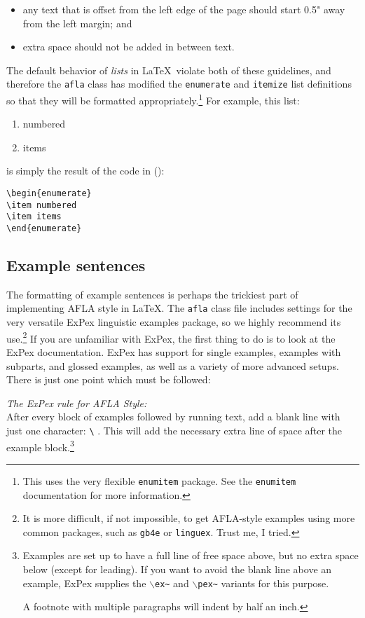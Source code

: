 \documentclass{afla}
\begin{document}
\begin{itemize}
\item any text that is offset from the left edge of the page should start 0.5" away from the left margin; and
\item extra space should not be added in between text.
\end{itemize}

\noindent The default behavior of \textit{lists} in \LaTeX\ violate both of these guidelines, and therefore the \verb`afla` class has modified the \verb`enumerate` and \verb`itemize` list definitions so that they will be formatted appropriately.\footnote{This uses the very flexible \texttt{enumitem} package. See the \texttt{enumitem} documentation for more information.} For example, this list:

\begin{enumerate}
\item numbered
\item items
\end{enumerate}

\noindent is simply the result of the code in (\nextx):

\ex \verb`\begin{enumerate}`\\
	\verb`\item numbered`\\
	\verb`\item items`\\
	\verb`\end{enumerate}`
\xe

\subsection{Example sentences}

The formatting of example sentences is perhaps the trickiest part of implementing AFLA style in \LaTeX. The \verb`afla` class file includes settings for the very versatile ExPex linguistic examples package, so we highly recommend its use.\footnote{It is more difficult, if not impossible, to get AFLA-style examples using more common packages, such as \texttt{gb4e} or \texttt{linguex}. Trust me, I tried.} If you are unfamiliar with ExPex, the first thing to do is to look at the ExPex documentation. ExPex has support for single examples, examples with subparts, and glossed examples, as well as a variety of more advanced setups. There is just one point which must be followed:

\ex \textit{The ExPex rule for AFLA Style:}\\
	After every block of examples followed by running text, add a blank line with just one character: \verb`\` . This will add the necessary extra line of space after the example block.\footnote{Examples are set up to have a full line of free space above, but no extra space below (except for leading). If you want to avoid the blank line above an example, ExPex supplies the $\backslash$\texttt{ex\~} and $\backslash$\texttt{pex\~} variants for this purpose.

	A footnote with multiple paragraphs will indent by half an inch.}
\xe
\
\end{document}
